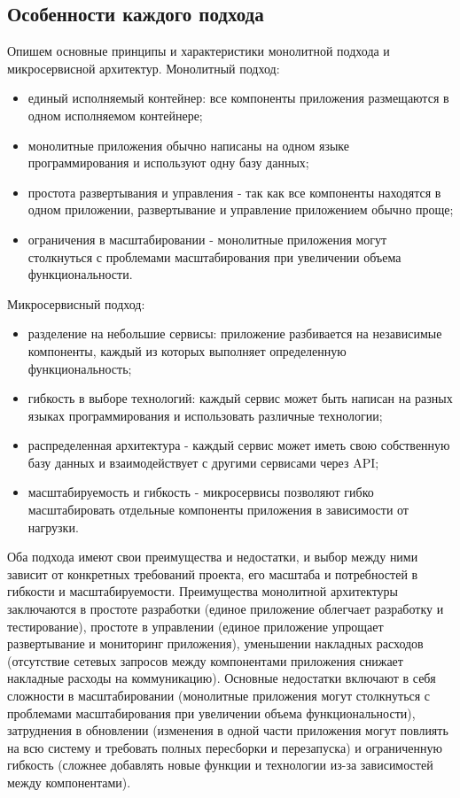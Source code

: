 \subsection{Особенности каждого подхода}
    Опишем основные принципы и характеристики монолитной подхода и микросервисной архитектур.
    Монолитный подход:
    \begin{itemize}
        \item единый исполняемый контейнер: все компоненты приложения размещаются в одном исполняемом контейнере;
        \item монолитные приложения обычно написаны на одном языке программирования и используют одну базу данных;
        \item простота развертывания и управления - так как все компоненты находятся в одном приложении, развертывание и управление приложением обычно проще;
        \item ограничения в масштабировании - монолитные приложения могут столкнуться с проблемами масштабирования при увеличении объема функциональности.
    \end{itemize}

    Микросервисный подход:
     \begin{itemize}
        \item разделение на небольшие сервисы: приложение разбивается на независимые компоненты, каждый из которых выполняет определенную функциональность;
        \item гибкость в выборе технологий: каждый сервис может быть написан на разных языках программирования и использовать различные технологии;
        \item распределенная архитектура - каждый сервис может иметь свою собственную базу данных и взаимодействует с другими сервисами через API;
        \item масштабируемость и гибкость - микросервисы позволяют гибко масштабировать отдельные компоненты приложения в зависимости от нагрузки.
    \end{itemize}

    Оба подхода имеют свои преимущества и недостатки, и выбор между ними зависит от конкретных требований проекта, его масштаба и потребностей в гибкости и масштабируемости. Преимущества монолитной архитектуры заключаются в простоте разработки (единое приложение облегчает разработку и тестирование), простоте в управлении (единое приложение упрощает развертывание и мониторинг приложения), уменьшении накладных расходов (отсутствие сетевых запросов между компонентами приложения снижает накладные расходы на коммуникацию). Основные недостатки включают в себя сложности в масштабировании (монолитные приложения могут столкнуться с проблемами масштабирования при увеличении объема функциональности), затруднения в обновлении (изменения в одной части приложения могут повлиять на всю систему и требовать полных пересборки и перезапуска) и ограниченную гибкость (сложнее добавлять новые функции и технологии из-за зависимостей между компонентами).
    
